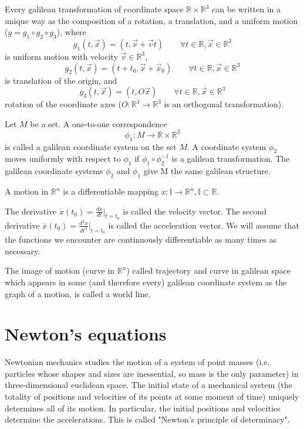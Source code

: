 \documentclass[11pt]{report}
\begin{document}
Every galilean transformation of  coordinate space $\mathbb{R} \times \mathbb{R}^3$
can be written in a unique way as the composition of a rotation, a translation,
and a uniform motion ($g = g_1 \circ g_2 \circ g_3$), where
\[g_1(t,\vec x)=(t,\vec x+\vec v t)\qquad \forall t\in \mathbb{R},\vec x \in\mathbb{R}^3\] is uniform motion with velocity $\vec v \in\mathbb{R}^3$,
\[g_2(t,\vec x)=(t+t_0,\vec x+\vec x_0)\qquad \forall t\in \mathbb{R},\vec x \in\mathbb{R}^3\] is translation of the origin, and
\[g_3(t,\vec x)=(t,O\vec x)\qquad \forall t\in \mathbb{R},\vec x \in\mathbb{R}^3\] rotation of the coordinate axes ($O:\mathbb{R}^3 \rightarrow \mathbb{R}^3$ is an orthogonal transformation).

Let $M$ be a set. A one-to-one correspondence 
\[\phi_1: M \rightarrow \mathbb{R} \times \mathbb{R}^3\]
is called a galilean coordinate system on the set $M$. A coordinate system $\phi_2$ moves
uniformly with respect to $\phi_1$  if $\phi_1\circ\phi_2^{-1}$ is a galilean
transformation. The galilean coordinate systems $\phi_2$ and $\phi_1$ give M the same
galilean structure.

A motion in $\mathbb{R}^n$ is a differentiable mapping 
$x: \mathbb{I}\rightarrow \mathbb{R}^n, \mathbb{I} \subset \mathbb{R}$.

The derivative $\dot{x}(t_0)=\frac{dx}{dt}|_{t=t_0}$ is called the velocity vector. 
The second derivative $\ddot{x}(t_0)=\frac{d^2x}{dt^2}|_{t=t_0}$ is called the acceleration vector.
We will assume that the functions we encounter are continuously 
differentiable as many times as necessary.

The image of motion (curve in $\mathbb{R}^n$) called trajectory and  curve in galilean space which appears in some (and therefore every) galilean coordinate system as the graph of a motion, is called a world line.
\section{Newton's equations}
\label{newton-eqs}
Newtonian mechanics studies the motion of a system of point masses (i.e. particles whose
shapes and sizes are inessential, so mass is the only parameter) in three-dimensional euclidean space. 
The initial state of a mechanical system (the totality of positions and
velocities of its points at some moment of time) uniquely determines all of
its motion. In particular, the initial positions and velocities determine the accelerations.
This is called "Newton's principle of determinacy".
\end{document}
